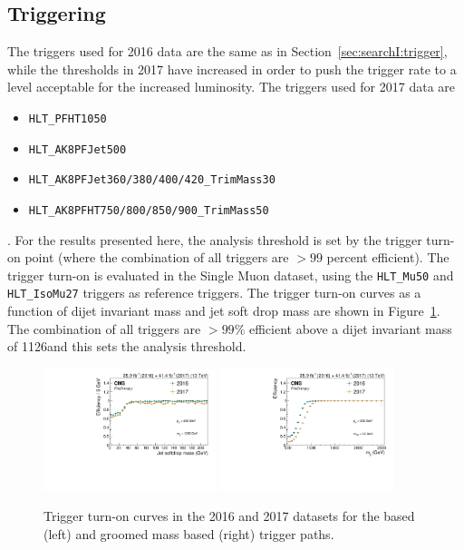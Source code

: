 \subsection{Triggering}
\label{sec:searchIII:trigger}
The triggers used for 2016 data are the same as in Section~\ref{sec:searchI:trigger}, while the thresholds in 2017 have increased in order to push the trigger rate to a level acceptable for the increased luminosity. The triggers used for 2017 data are
\begin{itemize}
\item \texttt{HLT\_PFHT1050}
\item \texttt{HLT\_AK8PFJet500}
\item \texttt{HLT\_AK8PFJet360/380/400/420\_TrimMass30}
\item \texttt{HLT\_AK8PFHT750/800/850/900\_TrimMass50}
\end{itemize}.
For the results presented here, the analysis threshold is set by the trigger turn-on point (where the combination of all triggers are $>99$ percent efficient). The trigger turn-on is evaluated in the Single Muon dataset, using the \texttt{HLT\_Mu50} and \texttt{HLT\_IsoMu27} triggers as reference triggers.  The trigger turn-on curves as a function of dijet invariant mass and jet soft drop mass are shown in Figure~\ref{fig:searchIII:trigturnon}.
The combination of all triggers are $>99\%$ efficient above a dijet invariant mass of 1126\GeV and this sets the analysis threshold. 
\begin{figure}[h!]
\centering 
\includegraphics[width=0.45\textwidth]{figures/analysis/search3/B2G-18-002/Combined_mj1_16vs17.pdf}
\includegraphics[width=0.45\textwidth]{figures/analysis/search3/B2G-18-002/Combined_mjj_16vs17.pdf}
\caption{Trigger turn-on curves in the 2016 and 2017 datasets for the \HT based (left) and groomed mass based (right) trigger paths.}
\label{fig:searchIII:trigturnon}
\end{figure}

